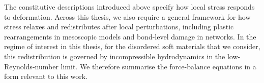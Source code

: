 \documentclass[asymmetricmargins]{library/duthesis}%
\begin{document}
The constitutive descriptions introduced above specify how local stress responds to deformation. Across this thesis, we also require a general framework for how stress relaxes and redistributes after local perturbations, including plastic rearrangements in mesoscopic models and bond-level damage in networks. In the regime of interest in this thesis, for the disordered soft materials that we consider, this redistribution is governed by incompressible hydrodynamics in the low-Reynolds-number limit. We therefore summarise the force-balance equations in a form relevant to this work.



\end{document}
